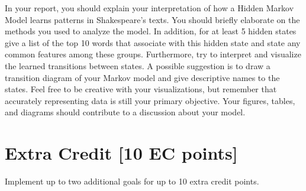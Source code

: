In your report, you should explain your interpretation of how a Hidden Markov Model learns patterns in Shakespeare's texts. You should briefly elaborate on the methods you used to analyze the model. In addition, for at least 5 hidden states give a list of the top 10 words that associate with this hidden state and state any common features among these groups. Furthermore, try to interpret and visualize the learned transitions between states. A possible suggestion is to draw a transition diagram of your Markov model and give descriptive names to the states. Feel free to be creative with your visualizations, but remember that accurately representing data is still your primary objective. Your figures, tables, and diagrams should contribute to a discussion about your model.

\section{Extra Credit [10 EC points]}

Implement up to two additional goals for up to 10 extra credit points.


